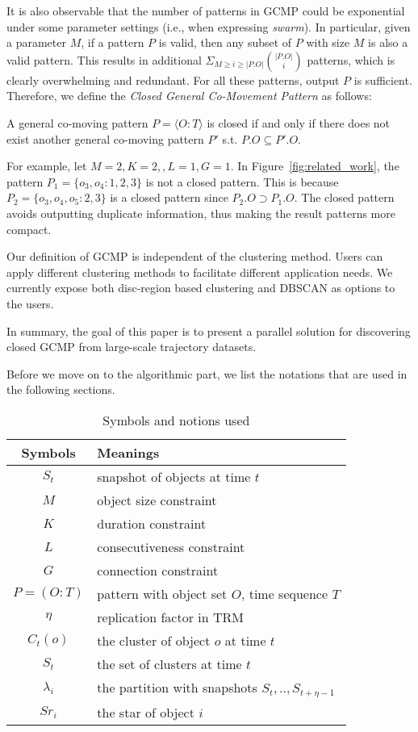 It is also observable that the number of patterns in GCMP could be exponential under some parameter settings (i.e., 
when expressing \emph{swarm}). In particular, given a parameter $M$, if a pattern $P$ is valid, then any subset of $P$ with 
size $M$ is also a valid pattern. This results in additional $\Sigma_{M\geq i \geq |P.O|} {|P.O| \choose i}$ patterns,
which is clearly overwhelming and redundant. For all these patterns, output $P$ is sufficient. Therefore, we define the \emph{Closed General Co-Movement Pattern} as follows:


\begin{definition}
A general co-moving pattern $P=\langle O:T \rangle$ is closed if and only if there does not exist another general co-moving pattern $P'$ s.t. $P.O \subseteq P'.O$.
\end{definition}

For example, let $M=2,K=2,,L=1,G=1$. In Figure~\ref{fig:related_work},
the pattern $P_1 = \{o_3,o_4:1,2,3\}$ is not a closed pattern. This is because $P_2=\{o_3,o_4,o_5:2,3\}$ is a closed pattern since $P_2.O \supset P_1.O$. The closed pattern avoids outputting duplicate information, thus making the result patterns more compact. 

Our definition of GCMP is independent of the clustering method. Users can apply different clustering methods to facilitate different application needs. 
We currently expose both disc-region based clustering and DBSCAN as options to the users.

In summary, the goal of this paper is to present a parallel solution for discovering closed GCMP from large-scale trajectory datasets.

Before we move on to the algorithmic part, we list the notations that are used in the following sections.

\begin{table}[h]
\centering
\begin{tabular}{|c|l|} 
\hline
Symbols & Meanings \\
\hline
$S_t$ & snapshot of objects at time $t$ \\
\hline
$M$ & object size constraint \\
\hline 
$K$ & duration constraint\\
\hline
$L$ & consecutiveness constraint\\
\hline
$G$ & connection constraint \\
\hline
$P=(O:T)$ & pattern with object set $O$, time sequence $T$\\
\hline
$\eta$ & replication factor in TRM\\
\hline
$C_t(o)$ & the cluster of object $o$ at time $t$ \\
\hline 
$S_t$ & the set of clusters at time $t$\\
\hline 
$\lambda_i$ & the partition with snapshots $S_t,..,S_{t+\eta-1}$ \\
\hline
$Sr_i $ &  the star of object $i$ \\
\hline 
\end{tabular} 
\caption{Symbols and notions used}
\end{table}